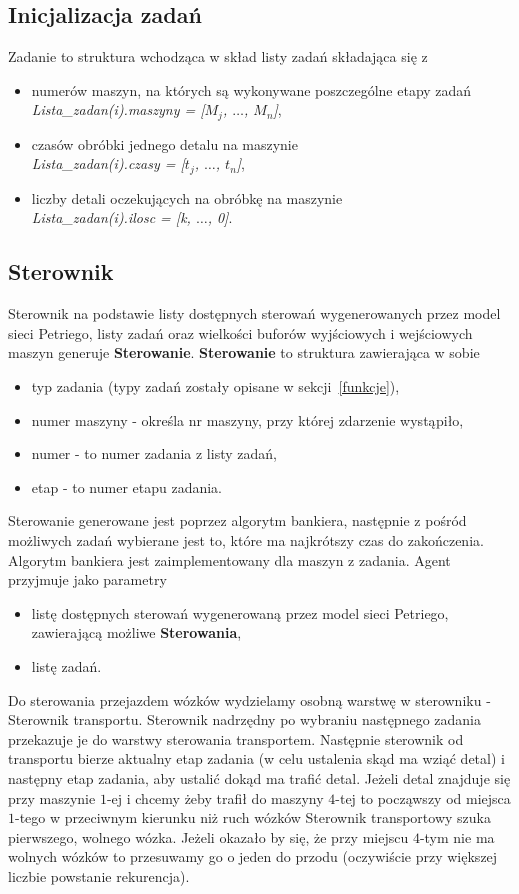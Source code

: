 \documentclass[10pt, a4paper]{article}
\begin{document}
\subsection{Inicjalizacja zadań}
Zadanie to struktura wchodząca w skład listy zadań składająca się z
\begin{itemize}
\item  numerów maszyn, na których są wykonywane poszczególne etapy zadań\\
\textit{Lista\_zadan(i).maszyny = [$M_j$, $\dots$,  $M_n$]},
\item czasów obróbki jednego detalu na maszynie\\
\textit{Lista\_zadan(i).czasy = [$t_j$, $\dots$,  $t_n$]},
\item liczby detali oczekujących na obróbkę na maszynie\\
\textit{Lista\_zadan(i).ilosc   = [k, $\dots$, 0]}.
\label{lista_zad}
\end{itemize}
\subsection{Sterownik}
Sterownik na podstawie listy dostępnych sterowań wygenerowanych przez model sieci Petriego, listy zadań oraz wielkości buforów wyjściowych i wejściowych maszyn generuje \textbf{Sterowanie}. \textbf{Sterowanie} to struktura zawierająca w sobie
\begin{itemize}
\item typ zadania (typy zadań zostały opisane w sekcji~\ref{funkcje}),
\item numer maszyny - określa nr maszyny, przy której zdarzenie wystąpiło,
\item numer - to numer zadania z listy zadań,
\item etap - to numer etapu zadania.
\end{itemize}
Sterowanie generowane jest poprzez algorytm bankiera, następnie z pośród możliwych zadań wybierane jest to, które ma najkrótszy czas do zakończenia. Algorytm bankiera jest zaimplementowany dla maszyn z zadania.  Agent przyjmuje jako parametry
\begin{itemize}
\item listę dostępnych sterowań wygenerowaną przez model sieci Petriego, zawierającą możliwe \textbf{Sterowania},
\item listę zadań.
\end{itemize}
Do sterowania przejazdem wózków wydzielamy osobną warstwę w sterowniku - Sterownik transportu. Sterownik nadrzędny po wybraniu następnego zadania przekazuje je do warstwy sterowania transportem. Następnie sterownik od transportu bierze aktualny etap zadania (w celu ustalenia skąd ma wziąć detal) i następny etap zadania, aby ustalić dokąd ma trafić detal. Jeżeli detal znajduje się przy maszynie $1$-ej i chcemy żeby trafił do maszyny $4$-tej to począwszy od miejsca $1$-tego w przeciwnym kierunku niż ruch wózków Sterownik transportowy szuka pierwszego, wolnego wózka. Jeżeli okazało by się, że przy miejscu $4$-tym nie ma wolnych wózków to przesuwamy go o jeden do przodu (oczywiście przy większej liczbie powstanie rekurencja).
\end{document}
